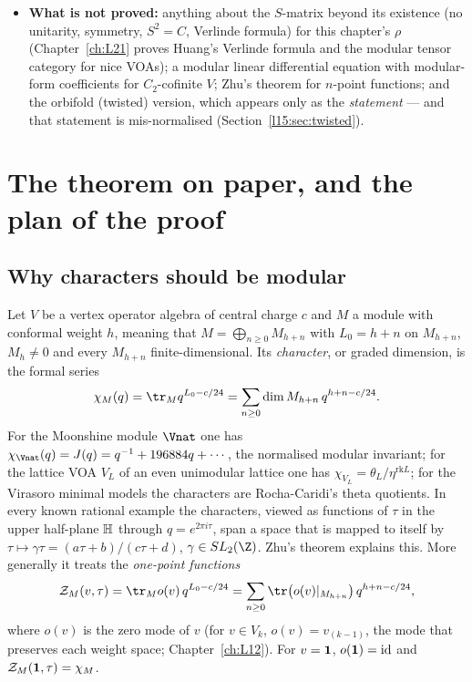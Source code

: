 \begin{itemize}
   wrapper (the quoted statements are the current ones); some auxiliary theorems still carry .
\item \textbf{What is not proved:} anything about the $S$-matrix beyond its existence (no unitarity, symmetry,
  $S^2=C$, Verlinde formula) for this chapter's $\rho$ (Chapter~\ref{ch:L21} proves Huang's Verlinde formula and the
  modular tensor category for nice VOAs); a modular linear differential equation with modular-form coefficients for $C_2$-cofinite
  $V$; Zhu's theorem for $n$-point functions; and the orbifold (twisted) version, which appears only as the
  \emph{statement}  --- and that statement is mis-normalised (Section~\ref{l15:sec:twisted}).
\end{itemize}

\section{The theorem on paper, and the plan of the proof}\label{l15:sec:plan}

\subsection{Why characters should be modular}

Let $V$ be a vertex operator algebra of central charge $c$ and $M$ a module with conformal weight $h$, meaning that
$M=\bigoplus_{n\ge0}M_{h+n}$ with $L_0=h+n$ on $M_{h+n}$, $M_h\neq0$ and every $M_{h+n}$ finite-dimensional. Its
\emph{character}, or graded dimension, is the formal series
\begin{equation*}
  \chi_M(q)=\tr_M q^{L_0-c/24}=\sum_{n\ge0}\dim M_{h+n}\,q^{h+n-c/24}.
\end{equation*}
For the Moonshine module $\Vnat$ one has $\chi_{\Vnat}(q)=J(q)=q^{-1}+196884q+\cdots$, the normalised modular
invariant; for the lattice VOA $V_L$ of an even unimodular lattice one has $\chi_{V_L}=\theta_L/\eta^{\mathrm{rk}L}$; for
the Virasoro minimal models the characters are Rocha-Caridi's theta quotients. In every known rational example the
characters, viewed as functions of $\tau$ in the upper half-plane $\mathbb{H}$ through $q=e^{2\pi i\tau}$, span a space
that is mapped to itself by $\tau\mapsto\gamma\tau=(a\tau+b)/(c\tau+d)$, $\gamma\in\lfifteenSL$. Zhu's theorem explains
this. More generally it treats the \emph{one-point functions}
\begin{equation*}
  \lfifteenZ_M(v,\tau)=\tr_M o(v)\,q^{L_0-c/24}=\sum_{n\ge0}\tr\bigl(o(v)|_{M_{h+n}}\bigr)\,q^{h+n-c/24},
\end{equation*}
where $o(v)$ is the zero mode of $v$ (for $v\in V_k$, $o(v)=v_{(k-1)}$, the mode that preserves each weight space;
Chapter~\ref{ch:L12}). For $v=\mathbf{1}$, $o(\mathbf{1})=\mathrm{id}$ and $\mathcal{Z}_M(\mathbf{1},\tau)=\chi_M$.

